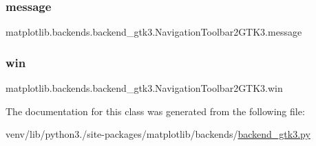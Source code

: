 \subsubsection{\texorpdfstring{message}{message}}
{\footnotesize\ttfamily matplotlib.\+backends.\+backend\+\_\+gtk3.\+Navigation\+Toolbar2\+G\+T\+K3.\+message}

\mbox{\label{classmatplotlib_1_1backends_1_1backend__gtk3_1_1NavigationToolbar2GTK3_a586a0ded2b7e445e66e6f568f9c11623}} 
\subsubsection{\texorpdfstring{win}{win}}
{\footnotesize\ttfamily matplotlib.\+backends.\+backend\+\_\+gtk3.\+Navigation\+Toolbar2\+G\+T\+K3.\+win}



The documentation for this class was generated from the following file\+:\begin{DoxyCompactItemize}
\item 
venv/lib/python3./site-\/packages/matplotlib/backends/\hyperlink{backend__gtk3_8py}{backend\+\_\+gtk3.\+py}\end{DoxyCompactItemize}
